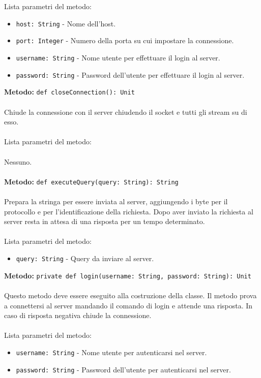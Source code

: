 \documentclass[a4paper]{article}
\begin{document}
			\\ \\
			Lista parametri del metodo:
			\begin{itemize}
				\item \texttt{host: String} - Nome dell'host.
				\item \texttt{port: Integer} - Numero della porta su cui impostare la connessione.
				\item \texttt{username: String} - Nome utente per effettuare il login al server.
				\item \texttt{password: String} - Password dell'utente per effettuare il login al server.
			\end{itemize}
			\textbf{Metodo: }\texttt{def closeConnection(): Unit}
			\\ \\
			Chiude la connessione con il server chiudendo il socket e tutti gli stream su di esso.
			\\ \\
			Lista parametri del metodo:
			\\ \\
			Nessuno.
			\\ \\
			\textbf{Metodo: }\texttt{def executeQuery(query: String): String}
			\\ \\
			Prepara la stringa per essere inviata al server, aggiungendo i byte per il protocollo e per l'identificazione della richiesta. Dopo aver inviato la richiesta al server resta in attesa di una risposta per un tempo determinato.
			\\ \\
			Lista parametri del metodo:
			\begin{itemize}
				\item \texttt{query: String} - Query da inviare al server.
			\end{itemize}
			\textbf{Metodo: }\texttt{private def login(username: String, password: String): Unit}
			\\ \\
			Questo metodo deve essere eseguito alla costruzione della classe. Il metodo prova a connettersi al server mandando il comando di login e attende una risposta. In caso di risposta negativa chiude la connessione.
			\\ \\
			Lista parametri del metodo:
			\begin{itemize}
				\item \texttt{username: String} - Nome utente per autenticarsi nel server.
				\item \texttt{password: String} - Password dell'utente per autenticarsi nel server.
			\end{itemize}
			
\end{document}
